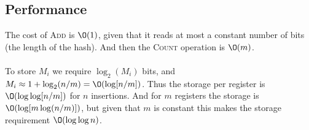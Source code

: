 \subsection{Performance}
The cost of \textsc{Add} is $\O(1)$, given that it reads at most a constant number of bits (the length of the hash). And then the \textsc{Count} operation is $\O(m)$. 
\\\\
To store $M_i$ we require $\log_2(M_i)$ bits, and $M_i\approx1+\log_2(n/m)=\O(\log[n/m])$. Thus the storage per register is $\O(\log\log [n/m])$ for $n$ insertions. And for $m$ registers the storage is $\O(\log [m\log (n/m)])$, but given that $m$ is constant this makes the storage requirement $\O(\log\log n)$.
